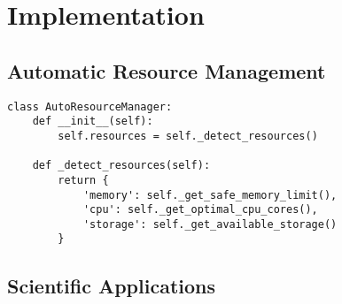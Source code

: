 \documentclass[11pt,a4paper]{article}
\begin{document}
\section{Implementation}

\subsection{Automatic Resource Management}
\begin{verbatim}
class AutoResourceManager:
    def __init__(self):
        self.resources = self._detect_resources()
        
    def _detect_resources(self):
        return {
            'memory': self._get_safe_memory_limit(),
            'cpu': self._get_optimal_cpu_cores(),
            'storage': self._get_available_storage()
        }
\end{verbatim}

\subsection{Scientific Applications}
\end{document}
